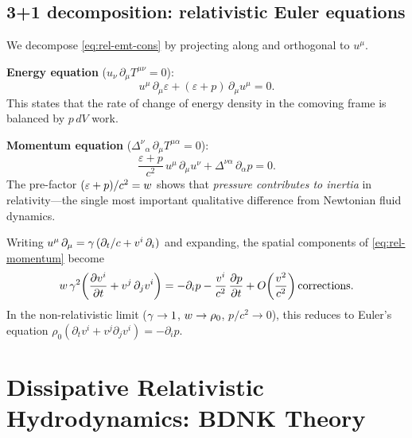\subsection{3+1 decomposition: relativistic Euler equations}
\label{sec:3plus1}

We decompose \eqref{eq:rel-emt-cons} by projecting along and
orthogonal to $u^{\mu}$.

\medskip\noindent
\textbf{Energy equation} ($u_{\nu}\,\partial_{\mu} T^{\mu\nu} = 0$):
\begin{equation}
  u^{\mu}\,\partial_{\mu}\varepsilon
  + (\varepsilon + p)\,\partial_{\mu} u^{\mu} = 0.
  \label{eq:rel-energy}
\end{equation}
This states that the rate of change of energy density in the comoving
frame is balanced by $p\,dV$ work.

\medskip\noindent
\textbf{Momentum equation}
($\Delta^{\nu}{}_{\alpha}\,\partial_{\mu} T^{\mu\alpha} = 0$):
\begin{equation}
  \frac{\varepsilon + p}{c^2}\, u^{\mu}\,\partial_{\mu} u^{\nu}
  + \Delta^{\nu\alpha}\,\partial_{\alpha} p = 0.
  \label{eq:rel-momentum}
\end{equation}
The pre-factor $(\varepsilon + p)/c^2 = w$ shows that
\emph{pressure contributes to inertia} in relativity---the single
most important qualitative difference from Newtonian fluid dynamics.

Writing $u^{\mu}\,\partial_{\mu} = \gamma\,(\partial_t/c + v^i\,\partial_i)$
and expanding, the spatial components of
\eqref{eq:rel-momentum} become
\begin{equation}
  w\,\gamma^2\!\left(\frac{\partial v^i}{\partial t}
    + v^j\,\partial_j v^i\right)
  = -\partial_i p
    - \frac{v^i}{c^2}\,\frac{\partial p}{\partial t}
    + O\!\left(\frac{v^2}{c^2}\right)\text{corrections}.
  \label{eq:rel-euler-spatial}
\end{equation}
In the non-relativistic limit ($\gamma \to 1$, $w \to \rho_0$,
$p/c^2 \to 0$), this reduces to Euler's equation
$\rho_0(\partial_t v^i + v^j\partial_j v^i) = -\partial_i p$.


\section{Dissipative Relativistic Hydrodynamics: BDNK Theory}
\label{sec:bdnk}

